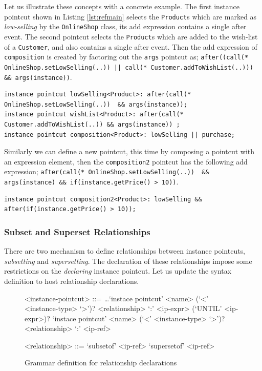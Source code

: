 \documentclass{llncs}
\begin{document}
Let us illustrate these concepts with a concrete example. The first instance pointcut shown in Listing \ref{lst:refmain} selects the \texttt{Product}s which are marked as \emph{low-selling} by the \texttt{OnlineShop} class, its add expression contains a single after event. The second pointcut selects the \texttt{Product}s which are added to the wish-list of a \texttt{Customer}, and also contains a single after event. Then the add expression of \texttt{composition} is created by factoring out the \texttt{args} pointcut as; \lstinline!after((call(* OnlineShop.setLowSelling(..)) || call(* Customer.addToWishList(..))) && args(instance))!. 

\begin{lstlisting}[float=h!, caption={Two instance pointcuts composed to obtain a new one}, label={lst:refmain}]
instance pointcut lowSelling<Product>: after(call(* OnlineShop.setLowSelling(..))  && args(instance));
instance pointcut wishList<Product>: after(call(* Customer.addToWishList(..)) && args(instance)) ;
instance pointcut composition<Product>: lowSelling || purchase;
\end{lstlisting}

Similarly we can define a new pointcut, this time by composing a pointcut with an expression element, then the \texttt{composition2} pointcut has the following add expression; \lstinline!after(call(* OnlineShop.setLowSelling(..))  && args(instance) && if(instance.getPrice() > 10))!.

\begin{lstlisting}[float=h!, caption={Two instance pointcuts composed to obtain a new one}, label={lst:refmain}]
instance pointcut composition2<Product>: lowSelling && after(if(instance.getPrice() > 10));
\end{lstlisting}


\subsubsection{Subset and Superset Relationships}
There are two mechanism to define relationships between instance pointcuts, \emph{subsetting} and \emph{supersetting}. The declaration of these relationships impose some restrictions on the \emph{declaring} instance pointcut. Let us update the syntax definition to host relationship declarations.

\begin{figure}[h]
\begin{grammar}
<instance-pointcut> ::= \ldots \alt `instace pointcut' <name> (`<' <instance-type> `>')? <relationship> `:' <ip-expr> (`UNTIL' <ip-expr>)?  \alt
	`instace pointcut' <name> (`<' <instance-type> `>')? <relationship> `:' <ip-ref>

<relationship> ::= `subsetof' <ip-ref> \alt `supersetof' <ip-ref>
\end{grammar}
\caption{Grammar definition for relationship declarations}
\label{fig:grammar3}
\end{figure}
\end{document}
